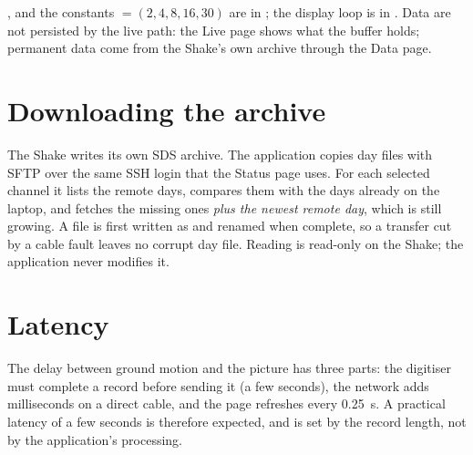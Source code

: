 \begin{rs3dapp}
,  and the constants $=(2,4,8,16,30)$ are in ; the
display loop is in . Data are not persisted by the live path: the Live page shows what the buffer
holds; permanent data come from the Shake's own archive through the Data page.
\end{rs3dapp}

\section{Downloading the archive}
The Shake writes its own SDS archive. The application copies day files with SFTP over the same SSH login that the Status
page uses. For each selected channel it lists the remote days, compares them with the days already on the laptop, and fetches
the missing ones \emph{plus the newest remote day}, which is still growing. A file is first written as
 and renamed when complete, so a transfer cut by a cable fault leaves no corrupt day file. Reading
is read-only on the Shake; the application never modifies it.

\section{Latency}
The delay between ground motion and the picture has three parts: the digitiser must complete a record before sending
it (a few seconds), the network adds milliseconds on a direct cable, and the page refreshes every 0.25~s. A practical
latency of a few seconds is therefore expected, and is set by the record length, not by the application's processing.
